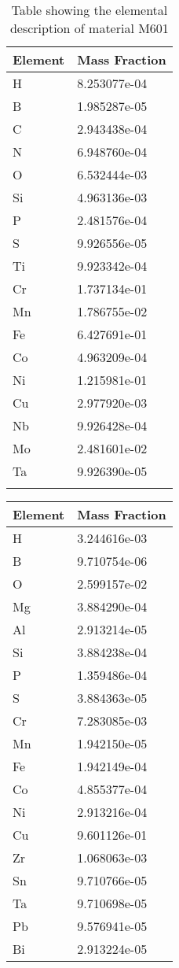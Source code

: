 \begin{centering}
\begin{longtable}[ht!]
\caption{Table showing the elemental description of material M925}
\label{table:material_EppMix}
\end{longtable}
\clearpage

\begin{longtable}[ht!]
{ p{} | p{} }
\hline
Element & Mass Fraction\\
\hline
H &  8.253077e-04\\
B &  1.985287e-05\\
C &  2.943438e-04\\
N &  6.948760e-04\\
O &  6.532444e-03\\
Si &  4.963136e-03\\
P &  2.481576e-04\\
S &  9.926556e-05\\
Ti &  9.923342e-04\\
Cr &  1.737134e-01\\
Mn &  1.786755e-02\\
Fe &  6.427691e-01\\
Co &  4.963209e-04\\
Ni &  1.215981e-01\\
Cu &  2.977920e-03\\
Nb &  9.926428e-04\\
Mo &  2.481601e-02\\
Ta &  9.926390e-05\\

\caption{Table showing the elemental description of material M601}
\label{table:material_M601}
\end{longtable}
\clearpage

\begin{longtable}[ht!]
{ p{} | p{} }
\hline
Element & Mass Fraction\\
\hline
H &  3.244616e-03\\
B &  9.710754e-06\\
O &  2.599157e-02\\
Mg &  3.884290e-04\\
Al &  2.913214e-05\\
Si &  3.884238e-04\\
P &  1.359486e-04\\
S &  3.884363e-05\\
Cr &  7.283085e-03\\
Mn &  1.942150e-05\\
Fe &  1.942149e-04\\
Co &  4.855377e-04\\
Ni &  2.913216e-04\\
Cu &  9.601126e-01\\
Zr &  1.068063e-03\\
Sn &  9.710766e-05\\
Ta &  9.710698e-05\\
Pb &  9.576941e-05\\
Bi &  2.913224e-05\\


\end{longtable}
\end{centering}
